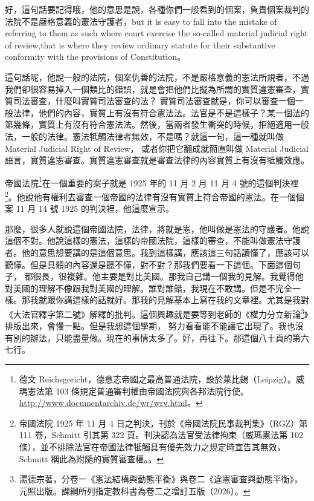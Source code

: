 \hypertarget{w05:cue:253}{}好，這句話要記得哦，他的意思是說，各種你們一般看到的個案，負責個案裁判的法院不是嚴格意義的憲法守護者，but it is easy to fall into the mistake of referring to them as such where court exercise the so-called material judicial right of review,that is where they review ordinary statute for their substantive conformity with the provisions of Constitution。

\hypertarget{w05:cue:254}{}這句話呢，他說一般的法院，個案仇善的法院，不是嚴格意義的憲法所規者，不過我們卻很容易掉入一個類比的錯誤，就是會把他們比擬為所謂的實質違憲審查，實質司法審查，什麼叫實質司法審查的法？
\hypertarget{w05:cue:255}{}實質司法審查就是，你可以審查一個一般法律，他們的內容，實質上有沒有符合憲法法。法官是不是這樣子？某一個法的第幾條，實質上有沒有符合憲法法。然後，當兩者發生衝突的時候，拒絕適用一般法，一般的法律。憲法牴觸法律者無效，不是嗎？就這一句，這一種就叫做 Material Judicial Right of Review，
\hypertarget{w05:cue:256}{}或者你把它翻成就簡直叫做 Material Judicial 語言，實質違憲審查。實質違憲審查就是審查法律的內容實質上有沒有牴觸效應。

\hypertarget{w05:cue:257}{}帝國法院\footnote{德文 Reichsgericht，德意志帝國之最高普通法院，設於萊比錫（Leipzig）。威瑪憲法第 103 條規定普通審判權由帝國法院與各邦法院行使。\url{http://www.documentarchiv.de/wr/wrv.html}。}在一個重要的案子就是 1925 年的 11 月 2 月 11 月 4 號的這個判決裡\footnote{帝國法院 1925 年 11 月 4 日之判決，刊於《帝國法院民事裁判集》（RGZ）第 111 卷，Schmitt 引其第 322 頁。判決認為法官受法律拘束（威瑪憲法第 102 條），並不排除法官在帝國法律牴觸具有優先效力之規定時宣告其無效，Schmitt 稱此為附隨的實質審查權。\cite[79, 82]{schmitt2015}。}。他說他有權利去審查一個帝國的法律有沒有實質上符合帝國的憲法。在一個個案 11 月 14 號 1925 的判決裡，他這麼宣示。

\hypertarget{w05:cue:258}{}那麼，很多人就說這個帝國法院，法律，將就是憲，他叫做是憲法的守護者。他說這個不對。他說這樣的憲法，這樣的帝國法院，這樣的審查，不能叫做憲法守護者。他的意思想要講的是這個意思。我到這樣講，應該這三句話讀懂了，應該可以聽懂。但是具體的內容還是聽不懂，對不對？那我們要看一下這個。下面這個句子，
\hypertarget{w05:cue:259}{}都很長，很複雜。他主要是對比美國。那我自己講一個我的見解。我覺得他對美國的理解不像跟我對美國的理解。誰對誰錯，我現在不敢講。但是不完全一樣。那我就跟你講這樣的話就好。那我的見解基本上寫在我的文章裡。尤其是我對《大法官釋字第二號》解釋的批判。這個興趣就是要等到老師的《權力分立新論\footnote{湯德宗著，分卷一《憲法結構與動態平衡》與卷二《違憲審查與動態平衡》，元照出版。課綱所列指定教科書為卷二之增訂五版（2026）。}》排版出來，會慢一點。但是我想這個學期，
\hypertarget{w05:cue:260}{}努力看看能不能讓它出現了。我也沒有別的辦法，只能盡量做。現在的事情太多了。好，再往下。那這個八十頁的第六七行。

